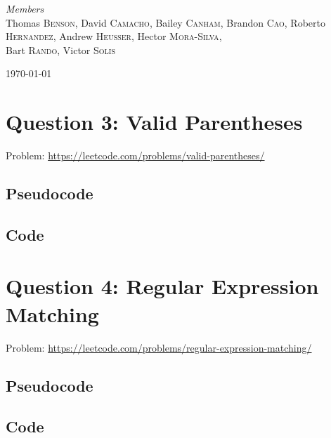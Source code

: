 \begin{titlepage}


	{\large\textit{Members}}\\
	Thomas \textsc{Benson}, %
	David \textsc{Camacho}, %
	Bailey \textsc{Canham}, %
	Brandon \textsc{Cao}, %
	Roberto \textsc{Hernandez}, %
	Andrew \textsc{Heusser}, %
    Hector \textsc{Mora-Silva},\\ %
	Bart \textsc{Rando}, %
	Victor \textsc{Solis} %


	\vfill\vfill\vfill %

	{\large\today} %


	\vfill %

\end{titlepage}


\section*{Question 3: Valid Parentheses}
Problem: \url{https://leetcode.com/problems/valid-parentheses/}

\subsection*{Pseudocode}
\subsection*{Code}

\section*{Question 4: Regular Expression Matching}
Problem: \url{https://leetcode.com/problems/regular-expression-matching/}
\subsection*{Pseudocode}
\subsection*{Code}

